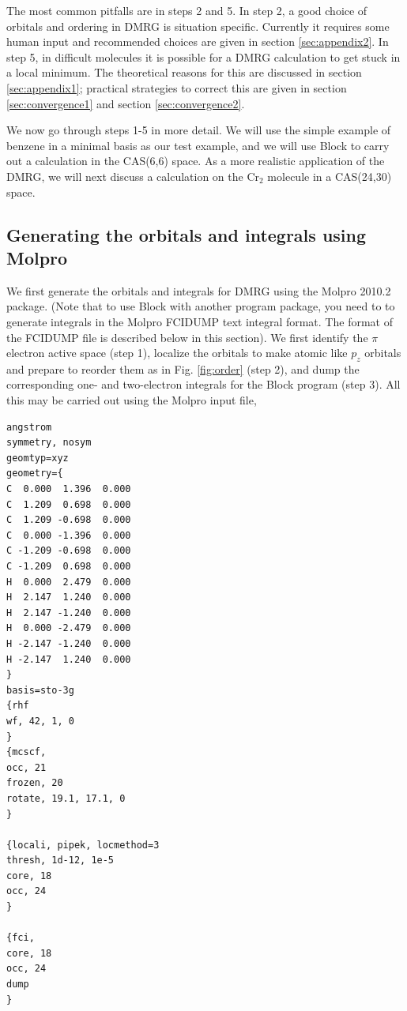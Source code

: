 \documentclass[letterpaper,12pt,aps, pra]{revtex4-1}
\begin{document}
The most common pitfalls are in steps 2 and 5. In step 2, a good choice of orbitals and ordering in DMRG is situation specific. Currently
it requires some human input and recommended choices are given in section \ref{sec:appendix2}. In step 5,
in difficult molecules it is possible for a DMRG calculation to get stuck in a local minimum. The theoretical reasons for this are discussed in section \ref{sec:appendix1};
practical strategies to correct this are given in section \ref{sec:convergence1} and section \ref{sec:convergence2}.

We now go through steps 1-5 in more detail. We will use the simple example of benzene in a minimal basis as our test example, and we will use Block
to carry out a calculation in the CAS(6,6) space. As a more realistic application of the DMRG, we will next discuss a calculation on the Cr$_2$ molecule
in a CAS(24,30) space.



\subsection{Generating the orbitals and integrals using Molpro}

We first generate the orbitals and integrals for DMRG using the Molpro 2010.2 package. 
(Note that to use Block with another program package, you need to
to generate integrals in the Molpro FCIDUMP text integral format. The format of the FCIDUMP file is described below in this section). We first identify
the $\pi$ electron active space (step 1), localize the orbitals to make atomic like $p_z$ orbitals and prepare to reorder them as in Fig. \ref{fig:order} (step 2),
and dump the corresponding one- and two-electron integrals for the Block program (step 3). All this may be carried out using the Molpro input file,
{
\begin{verbatim}
angstrom
symmetry, nosym
geomtyp=xyz
geometry={
C  0.000  1.396  0.000
C  1.209  0.698  0.000
C  1.209 -0.698  0.000
C  0.000 -1.396  0.000
C -1.209 -0.698  0.000
C -1.209  0.698  0.000
H  0.000  2.479  0.000
H  2.147  1.240  0.000
H  2.147 -1.240  0.000
H  0.000 -2.479  0.000
H -2.147 -1.240  0.000
H -2.147  1.240  0.000
}
basis=sto-3g
{rhf
wf, 42, 1, 0
}
{mcscf,
occ, 21
frozen, 20
rotate, 19.1, 17.1, 0
}

{locali, pipek, locmethod=3
thresh, 1d-12, 1e-5
core, 18
occ, 24
}

{fci,
core, 18
occ, 24
dump
}
\end{verbatim}
}
\end{document}
